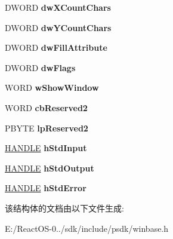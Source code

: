 \begin{DoxyCompactItemize}
\item 
\mbox{\label{struct___s_t_a_r_t_u_p_i_n_f_o_w_a1d142363bac5eb390ae489b8f95e393b}} 
D\+W\+O\+RD {\bfseries dw\+X\+Count\+Chars}
\item 
\mbox{\label{struct___s_t_a_r_t_u_p_i_n_f_o_w_af7bbdfd0b86628af9237e579f99c230a}} 
D\+W\+O\+RD {\bfseries dw\+Y\+Count\+Chars}
\item 
\mbox{\label{struct___s_t_a_r_t_u_p_i_n_f_o_w_a4db308ba13e25112b10490dafb3a5ab6}} 
D\+W\+O\+RD {\bfseries dw\+Fill\+Attribute}
\item 
\mbox{\label{struct___s_t_a_r_t_u_p_i_n_f_o_w_a63425bb059695df1c8d28fda876b3c4e}} 
D\+W\+O\+RD {\bfseries dw\+Flags}
\item 
\mbox{\label{struct___s_t_a_r_t_u_p_i_n_f_o_w_ae84da2f7722c7bcddc6b63ee890fb673}} 
W\+O\+RD {\bfseries w\+Show\+Window}
\item 
\mbox{\label{struct___s_t_a_r_t_u_p_i_n_f_o_w_ad03e8d70c15b7faf392af511faa5922b}} 
W\+O\+RD {\bfseries cb\+Reserved2}
\item 
\mbox{\label{struct___s_t_a_r_t_u_p_i_n_f_o_w_a027c610fdb4b2fa382a768404483e940}} 
P\+B\+Y\+TE {\bfseries lp\+Reserved2}
\item 
\mbox{\label{struct___s_t_a_r_t_u_p_i_n_f_o_w_a95b6f3ecb5bbd2d25109053e92f84a63}} 
\hyperlink{interfacevoid}{H\+A\+N\+D\+LE} {\bfseries h\+Std\+Input}
\item 
\mbox{\label{struct___s_t_a_r_t_u_p_i_n_f_o_w_a889e542265bf39b29b3ae5a8851a3125}} 
\hyperlink{interfacevoid}{H\+A\+N\+D\+LE} {\bfseries h\+Std\+Output}
\item 
\mbox{\label{struct___s_t_a_r_t_u_p_i_n_f_o_w_a2efd72806f0abc488891e5a53433d67a}} 
\hyperlink{interfacevoid}{H\+A\+N\+D\+LE} {\bfseries h\+Std\+Error}
\end{DoxyCompactItemize}


该结构体的文档由以下文件生成\+:\begin{DoxyCompactItemize}
\item 
E\+:/\+React\+O\+S-\/0../sdk/include/psdk/winbase.\+h\end{DoxyCompactItemize}
